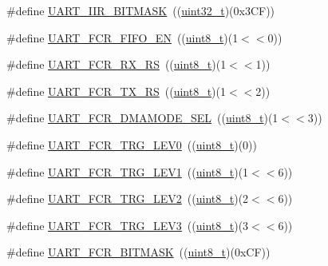 \begin{DoxyCompactItemize}
\item 
\#define \hyperlink{group___u_a_r_t___private___macros_gad443b74131fa7b7aecf0f1c581172faa}{U\+A\+R\+T\+\_\+\+I\+I\+R\+\_\+\+B\+I\+T\+M\+A\+SK}~((\hyperlink{_p_e___types_8h_a33594304e786b158f3fb30289278f5af}{uint32\+\_\+t})(0x3\+C\+F))
\item 
\#define \hyperlink{group___u_a_r_t___private___macros_gadec12ecfc7ae1198cee68f2cad982bcb}{U\+A\+R\+T\+\_\+\+F\+C\+R\+\_\+\+F\+I\+F\+O\+\_\+\+EN}~((\hyperlink{_p_e___types_8h_aba7bc1797add20fe3efdf37ced1182c5}{uint8\+\_\+t})(1$<$$<$0))
\item 
\#define \hyperlink{group___u_a_r_t___private___macros_ga246b37ccd6137c0bb51eb32760cb228e}{U\+A\+R\+T\+\_\+\+F\+C\+R\+\_\+\+R\+X\+\_\+\+RS}~((\hyperlink{_p_e___types_8h_aba7bc1797add20fe3efdf37ced1182c5}{uint8\+\_\+t})(1$<$$<$1))
\item 
\#define \hyperlink{group___u_a_r_t___private___macros_ga1c1a83fcacf333309330eea460d8a6a6}{U\+A\+R\+T\+\_\+\+F\+C\+R\+\_\+\+T\+X\+\_\+\+RS}~((\hyperlink{_p_e___types_8h_aba7bc1797add20fe3efdf37ced1182c5}{uint8\+\_\+t})(1$<$$<$2))
\item 
\#define \hyperlink{group___u_a_r_t___private___macros_ga996e144f7d08cb36aa729f28d74b5801}{U\+A\+R\+T\+\_\+\+F\+C\+R\+\_\+\+D\+M\+A\+M\+O\+D\+E\+\_\+\+S\+EL}~((\hyperlink{_p_e___types_8h_aba7bc1797add20fe3efdf37ced1182c5}{uint8\+\_\+t})(1$<$$<$3))
\item 
\#define \hyperlink{group___u_a_r_t___private___macros_gaba4b4e15936a075bf5054776fbd59676}{U\+A\+R\+T\+\_\+\+F\+C\+R\+\_\+\+T\+R\+G\+\_\+\+L\+E\+V0}~((\hyperlink{_p_e___types_8h_aba7bc1797add20fe3efdf37ced1182c5}{uint8\+\_\+t})(0))
\item 
\#define \hyperlink{group___u_a_r_t___private___macros_ga264238c2dde9248a73d679c32a74004b}{U\+A\+R\+T\+\_\+\+F\+C\+R\+\_\+\+T\+R\+G\+\_\+\+L\+E\+V1}~((\hyperlink{_p_e___types_8h_aba7bc1797add20fe3efdf37ced1182c5}{uint8\+\_\+t})(1$<$$<$6))
\item 
\#define \hyperlink{group___u_a_r_t___private___macros_ga7b655aba90b695210e7ce9f7b00cea89}{U\+A\+R\+T\+\_\+\+F\+C\+R\+\_\+\+T\+R\+G\+\_\+\+L\+E\+V2}~((\hyperlink{_p_e___types_8h_aba7bc1797add20fe3efdf37ced1182c5}{uint8\+\_\+t})(2$<$$<$6))
\item 
\#define \hyperlink{group___u_a_r_t___private___macros_ga9e6ef12c7a1f3514d6e30d7548ed3e46}{U\+A\+R\+T\+\_\+\+F\+C\+R\+\_\+\+T\+R\+G\+\_\+\+L\+E\+V3}~((\hyperlink{_p_e___types_8h_aba7bc1797add20fe3efdf37ced1182c5}{uint8\+\_\+t})(3$<$$<$6))
\item 
\#define \hyperlink{group___u_a_r_t___private___macros_ga2dd6b12c7c237b0a52c6a82698f85b04}{U\+A\+R\+T\+\_\+\+F\+C\+R\+\_\+\+B\+I\+T\+M\+A\+SK}~((\hyperlink{_p_e___types_8h_aba7bc1797add20fe3efdf37ced1182c5}{uint8\+\_\+t})(0x\+C\+F))
$$
\end{DoxyCompactItemize}
